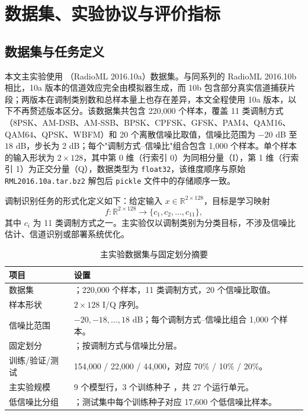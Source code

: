 \chapter{数据集、实验协议与评价指标}

\section{数据集与任务定义}

本文主实验使用 \datasetname{}（RadioML 2016.10a）数据集\cite{oshea2016radioml}。与同系列的 RadioML 2016.10b 相比，10a 版本的信道效应完全由模拟器生成，而 10b 包含部分真实信道捕获片段；两版本在调制类别数和总样本量上也存在差异，本文全程使用 10a 版本，以下不再赘述版本区分。该数据集共包含 220,000 个样本，覆盖 11 类调制方式（8PSK、AM-DSB、AM-SSB、BPSK、CPFSK、GFSK、PAM4、QAM16、QAM64、QPSK、WBFM）和 20 个离散信噪比取值，信噪比范围为 \(-20\) dB 至 \(18\) dB，步长为 2 dB；每个"调制方式--信噪比"组合包含 1,000 个样本。单个样本的输入形状为 \(2\times128\)，其中第 0 维（行索引 0）为同相分量（I），第 1 维（行索引 1）为正交分量（Q），数据类型为 \texttt{float32}，该维度顺序与原始 \texttt{RML2016.10a.tar.bz2} 解包后 \texttt{pickle} 文件中的存储顺序一致。

调制识别任务的形式化定义如下：给定输入 \(x\in\mathbb{R}^{2\times128}\)，目标是学习映射
\begin{equation}
  f:\mathbb{R}^{2\times128}\to\{c_1,c_2,\ldots,c_{11}\},
  \label{eq:task-definition}
\end{equation}
其中 \(c_i\) 为 11 类调制方式之一。主实验仅以调制类别为分类目标，不涉及信噪比估计、信道识别或部署系统优化。

\begin{table}[htbp]
  \centering
  \caption{主实验数据集与固定划分摘要}
  \label{tab:protocol-summary}
  \begin{tabularx}{\textwidth}{lX}
    \toprule
    项目 & 设置 \\
    \midrule
    数据集 & \datasetname{}；220,000 个样本，11 类调制方式，20 个信噪比取值。 \\
    样本形状 & \(2\times128\) I/Q 序列。 \\
    信噪比范围 & \(-20,-18,\ldots,18\) dB；每个调制方式--信噪比组合 1,000 个样本。 \\
    固定划分 & \splitname{}；按调制方式与信噪比分层。 \\
    训练/验证/测试 & 154,000 / 22,000 / 44,000，对应 70\% / 10\% / 20\%。 \\
    主实验规模 & 9 个模型行，3 个训练种子 \mainseeds{}，共 27 个运行单元。 \\
    低信噪比分组 & \lowSNR{}；测试集中每个训练种子对应 17,600 个低信噪比样本。 \\
    \bottomrule
  \end{tabularx}
\end{table}

